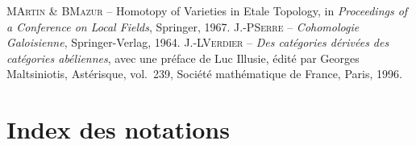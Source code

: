 \begin{thebibliography}{9}
{%
\textsc{M\ptbl Artin \& B\ptbl Mazur} -- {\og Homotopy of Varieties in Etale Topology\fg}, in \emph{Proceedings of a Conference on Local Fields}, Springer, 1967.
}
{%
\textsc{J.-P\ptbl Serre} -- \emph{Cohomologie Galoisienne}, Springer-Verlag, 1964.
}
{%
\textsc{J.-L\ptbl Verdier} -- \emph{Des cat\'egories d\'eriv\'ees des cat\'egories ab\'eliennes}, avec une pr\'eface de Luc Illusie, \'edit\'e par Georges Maltsiniotis, Ast\'erisque, vol.~239, Soci\'et\'e math\'ematique de France, Paris, 1996.
}
\end{thebibliography}

\chapter*{Index des notations}

